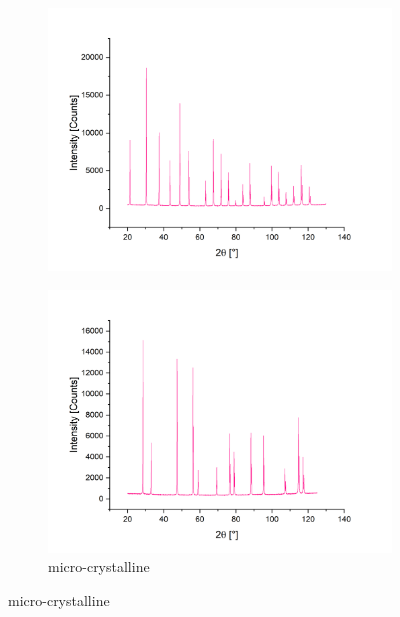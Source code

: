 \documentclass[12pt]{article}
\begin{document}
\begin{figure}[!ht]
    \begin{subfigure}{0.5\textwidth}
        \centering
        \includegraphics[width=\linewidth]{2_XRD/Graphics/Experiments/Spectra/Spectrum_LaB6.png}
        \caption{}
    \end{subfigure}
    \begin{subfigure}{0.5\textwidth}
        \centering
        \includegraphics[width=\linewidth]{2_XRD/Graphics/Experiments/Spectra/Spectrum_CeO2_1.png}
        \caption{micro-crystalline }
    \end{subfigure}

    \medskip
    

\end{figure}
\end{document}
